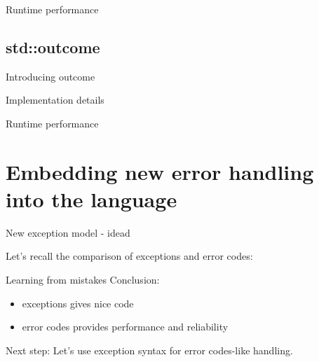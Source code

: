 \documentclass[10pt,a4paper]{beamer}
\begin{document}
\begin{frame}{Runtime performance}
\end{frame}

\subsection{std::outcome}

\begin{frame}{Introducing outcome}
\end{frame}

\begin{frame}{Implementation details}
\end{frame}

\begin{frame}{Runtime performance}
\end{frame}



\section{Embedding new error handling into the language}
\begin{frame}{New exception model - idea}d
	\begin{center}
		Let's recall the comparison of exceptions and error codes:
	\end{center}
	
	\begin{figure}
	\end{figure}
	
\end{frame}

\begin{frame}{Learning from mistakes}
	\centering
	Conclusion:
	
	\begin{itemize}
		\item exceptions gives nice code
		\item error codes provides performance and reliability
	\end{itemize}

	\begin{alertblock}{Next step:}
	Let's use exception syntax for error codes-like handling.
	\end{alertblock}
	
\end{frame}
	
\end{document}
